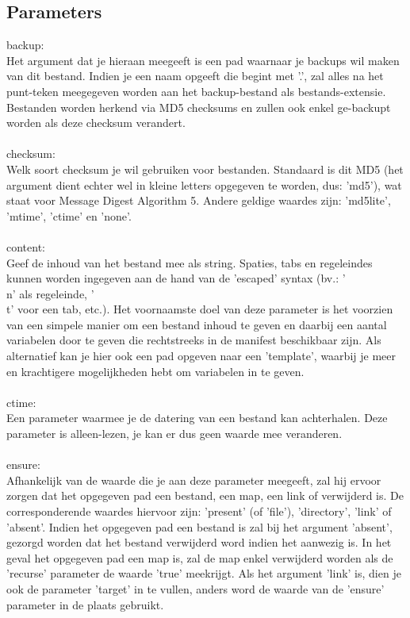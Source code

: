 \subsection{Parameters}
backup:\\
Het argument dat je hieraan meegeeft is een pad waarnaar je backups wil maken van dit bestand. Indien je een naam opgeeft die begint met '.', zal alles na het punt-teken meegegeven worden aan het backup-bestand als bestands-extensie. Bestanden worden herkend via MD5 checksums en zullen ook enkel ge-backupt worden als deze checksum verandert.\\\\
%
checksum:\\
Welk soort checksum je wil gebruiken voor bestanden. Standaard is dit MD5 (het argument dient echter wel in kleine letters opgegeven te worden, dus: 'md5'), wat staat voor Message Digest Algorithm 5. Andere geldige waardes zijn: 'md5lite', 'mtime', 'ctime' en 'none'.\\\\
%
content:\\
Geef de inhoud van het bestand mee als string. Spaties, tabs en regeleindes kunnen worden ingegeven aan de hand van de 'escaped' syntax (bv.: '\\n' als regeleinde, '\\t' voor een tab, etc.). Het voornaamste doel van deze parameter is het voorzien van een simpele manier om een bestand inhoud te geven en daarbij een aantal variabelen door te geven die rechtstreeks in de manifest beschikbaar zijn. Als alternatief kan je hier ook een pad opgeven naar een 'template', waarbij je meer en krachtigere mogelijkheden hebt om variabelen in te geven.\\\\
%
ctime:\\
Een parameter waarmee je de datering van een bestand kan achterhalen. Deze parameter is alleen-lezen, je kan er dus geen waarde mee veranderen.\\\\
%
ensure:\\
Afhankelijk van de waarde die je aan deze parameter meegeeft, zal hij ervoor zorgen dat het opgegeven pad een bestand, een map, een link of verwijderd is. De corresponderende waardes hiervoor zijn: 'present' (of 'file'), 'directory', 'link' of 'absent'. Indien het opgegeven pad een bestand is zal bij het argument 'absent', gezorgd worden dat het bestand verwijderd word indien het aanwezig is. In het geval het opgegeven pad een map is, zal de map enkel verwijderd worden als de 'recurse' parameter de waarde 'true' meekrijgt. Als het argument 'link' is, dien je ook de parameter 'target' in te vullen, anders word de waarde van de 'ensure' parameter in de plaats gebruikt.\\\\
